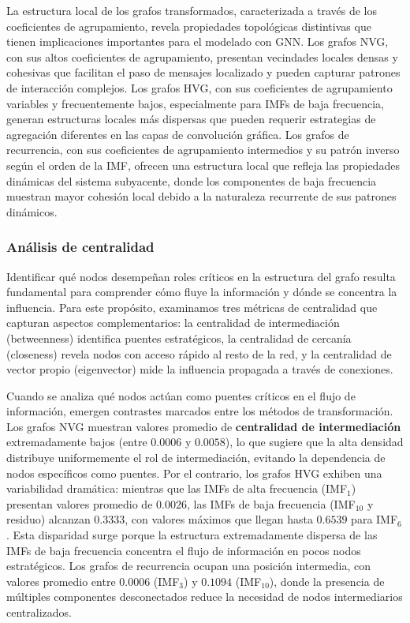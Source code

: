 \documentclass[11pt,a4paper]{article}
\begin{document}
La estructura local de los grafos transformados, caracterizada a través de los coeficientes de agrupamiento, revela propiedades topológicas distintivas que tienen implicaciones importantes para el modelado con GNN. Los grafos NVG, con sus altos coeficientes de agrupamiento, presentan vecindades locales densas y cohesivas que facilitan el paso de mensajes localizado y pueden capturar patrones de interacción complejos. Los grafos HVG, con sus coeficientes de agrupamiento variables y frecuentemente bajos, especialmente para IMFs de baja frecuencia, generan estructuras locales más dispersas que pueden requerir estrategias de agregación diferentes en las capas de convolución gráfica. Los grafos de recurrencia, con sus coeficientes de agrupamiento intermedios y su patrón inverso según el orden de la IMF, ofrecen una estructura local que refleja las propiedades dinámicas del sistema subyacente, donde los componentes de baja frecuencia muestran mayor cohesión local debido a la naturaleza recurrente de sus patrones dinámicos.

\subsubsection{Análisis de centralidad}

Identificar qué nodos desempeñan roles críticos en la estructura del grafo resulta fundamental para comprender cómo fluye la información y dónde se concentra la influencia. Para este propósito, examinamos tres métricas de centralidad que capturan aspectos complementarios: la centralidad de intermediación (betweenness) identifica puentes estratégicos, la centralidad de cercanía (closeness) revela nodos con acceso rápido al resto de la red, y la centralidad de vector propio (eigenvector) mide la influencia propagada a través de conexiones.

Cuando se analiza qué nodos actúan como puentes críticos en el flujo de información, emergen contrastes marcados entre los métodos de transformación. Los grafos NVG muestran valores promedio de \textbf{centralidad de intermediación} extremadamente bajos (entre $0.0006$ y $0.0058$), lo que sugiere que la alta densidad distribuye uniformemente el rol de intermediación, evitando la dependencia de nodos específicos como puentes. Por el contrario, los grafos HVG exhiben una variabilidad dramática: mientras que las IMFs de alta frecuencia (IMF$_1$) presentan valores promedio de $0.0026$, las IMFs de baja frecuencia (IMF$_{10}$ y residuo) alcanzan $0.3333$, con valores máximos que llegan hasta $0.6539$ para IMF$_6$. Esta disparidad surge porque la estructura extremadamente dispersa de las IMFs de baja frecuencia concentra el flujo de información en pocos nodos estratégicos. Los grafos de recurrencia ocupan una posición intermedia, con valores promedio entre $0.0006$ (IMF$_3$) y $0.1094$ (IMF$_{10}$), donde la presencia de múltiples componentes desconectados reduce la necesidad de nodos intermediarios centralizados.
\end{document}
